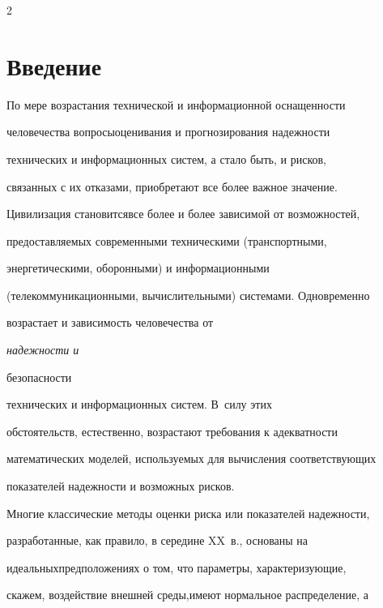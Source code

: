       \begin{multicols}{2}





            \label{st\stat}





\section{Введение}





По мере возрастания технической и информационной оснащенности


человечества вопросы\linebreak оценивания и прогнозирования надежности


технических и информационных систем, а стало быть, и рисков,


связанных с их отказами, приобретают все более важное значение.


Цивилизация становит\-ся\linebreak все более и более зависимой от возможностей,\linebreak


предоставляемых современными техническими (транспортными,


энергетическими, оборонными) и информационными


(телекоммуникационными, вычислительными) сис\-те\-ма\-ми. Одновременно


возрастает и зависимость человечества от {\it на\-деж\-ности и


безопасности} технических и информационных систем. В~силу этих


обстоятельств, естественно, возрастают требования к адекватности


математических моделей, используемых для вычисления соответствующих


показателей надежности и возможных рисков.





Многие классические методы оценки риска или показателей надежности,


разработанные, как правило, в середине XX~в., основаны на


идеальных\linebreak предположениях о том, что параметры, характеризующие,


скажем, воздействие внешней среды,\linebreak имеют нормальное распределение, а



\end{multicols}
